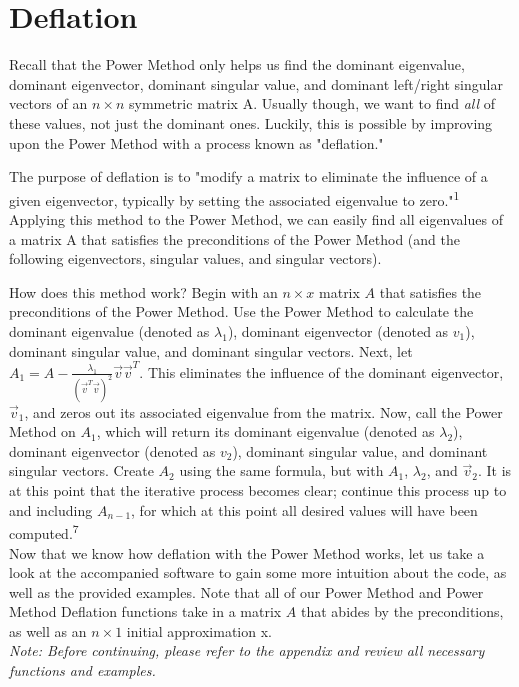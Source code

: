 \documentclass{article}
\begin{document}
\section{Deflation}
Recall that the Power Method only helps us find the dominant eigenvalue, dominant eigenvector, dominant singular value, and dominant left/right singular vectors of an $n \times n$ symmetric matrix A. Usually though, we want to find \textit{all} of these values, not just the dominant ones. Luckily, this is possible by improving upon the Power Method with a process known as "deflation."  
\par The purpose of deflation is to "modify a matrix to eliminate the influence of a given eigenvector, typically by setting the associated eigenvalue to zero."\textsuperscript{1} Applying this method to the Power Method, we can easily find all eigenvalues of a matrix A that satisfies the preconditions of the Power Method (and the following eigenvectors, singular values, and singular vectors).
\par How does this method work? Begin with an $n \times x$ matrix $A$ that satisfies the preconditions of the Power Method. Use the Power Method to calculate the dominant eigenvalue (denoted as $\lambda_1$), dominant eigenvector (denoted as $v_1$), dominant singular value, and dominant singular vectors. Next, let $A_1 = A - \frac{\lambda_1}{(\vec{v}^{T}\vec{v})^2} \vec{v}\vec{v}^{T}$. This eliminates the influence of the dominant eigenvector, $\vec{v}_1$, and zeros out its associated eigenvalue from the matrix. Now, call the Power Method on $A_1$, which will return its dominant eigenvalue (denoted as $\lambda_2$), dominant eigenvector (denoted as $v_2$), dominant singular value, and dominant singular vectors. Create $A_2$ using the same formula, but with $A_1$, $\lambda_2$, and $\vec{v}_2$. It is at this point that the iterative process becomes clear; continue this process up to and including $A_{n-1}$, for which at this point all desired values will have been computed.\textsuperscript{7} \\

\noindent Now that we know how deflation with the Power Method works, let us take a look at the accompanied software to gain some more intuition about the code, as well as the provided examples. Note that all of our Power Method and Power Method Deflation functions take in a matrix $A$ that abides by the preconditions, as well as an $n \times 1$ initial approximation x.\\

\noindent \textit{Note: Before continuing, please refer to the appendix and review all necessary functions and examples.}\\
\end{document}
